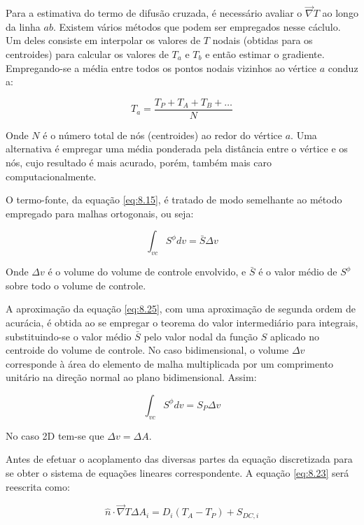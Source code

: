 Para a estimativa do termo de difusão cruzada, é necessário avaliar o $\vec{\nabla}T$ ao longo da linha $ab$. Existem vários métodos que podem ser empregados nesse cáclulo. Um deles consiste em interpolar os valores de $T$ nodais (obtidas para os centroides) para calcular os valores de $T_a$ e $T_b$ e então estimar o gradiente. Empregando-se a média entre todos os pontos nodais vizinhos ao vértice $a$ conduz a:

\begin{equation}
    \label{eq:8.24}
    T_a = \frac{T_P + T_A + T_B + \dots}{N}
\end{equation}

Onde $N$ é o número total de nós (centroides) ao redor do vértice $a$. Uma alternativa é empregar uma média ponderada pela distância entre o vértice e os nós, cujo resultado é mais acurado, porém, também mais caro computacionalmente.

O termo-fonte, da equação \ref{eq:8.15}, é tratado de modo semelhante ao método empregado para malhas ortogonais, ou seja:

\begin{equation}
    \label{eq:8.25}
    \int_{vc} S^\phi dv = \bar{S} \Delta v
\end{equation}

Onde $\Delta v$ é o volume do volume de controle envolvido, e $\bar{S}$ é o valor médio de $S^\phi$ sobre todo o volume de controle.

A aproximação da equação \ref{eq:8.25}, com uma aproximação de segunda ordem de acurácia, é obtida ao se empregar o teorema do valor intermediário para integrais, substituindo-se o valor médio $\bar{S}$ pelo valor nodal da função $S$ aplicado no centroide do volume de controle. No caso bidimensional, o volume $\Delta v$ corresponde à área do elemento de malha multiplicada por um comprimento unitário na direção normal ao plano bidimensional. Assim:

\begin{equation}
    \label{eq:8.26}
    \int_{vc} S^\phi dv = S_P \Delta v
\end{equation}

No caso 2D tem-se que $\Delta v = \Delta A$.

Antes de efetuar o acoplamento das diversas partes da equação discretizada para se obter o sistema de equações lineares correspondente. A equação \ref{eq:8.23} será reescrita como:

\begin{equation}
    \label{8.27}
    \hat{n} \cdot \vec{\nabla}T \Delta A_i = D_i (T_A-T_P) + S_{DC,i}
\end{equation}

